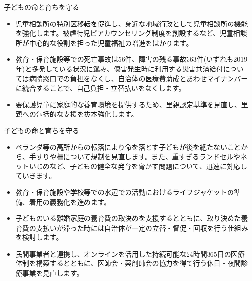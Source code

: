 \documentclass[dvipdfmx]{beamer}
\begin{document}
    \begin{frame}{子どもの命と育ちを守る}{}
        \begin{small}
            \begin{itemize}
                \setlength{\itemsep}{2mm}
                \item 児童相談所の特別区移転を促進し、身近な地域行政として児童相談所の機能を強化します。被虐待児ピアカウンセリング制度を創設するなど、児童相談所が中心的な役割を担った児童福祉の増進をはかります。
                \item 教育・保育施設等での死亡事故は56件、障害の残る事故363件(いずれも2019年)と多発している状況に鑑み、傷害発生時に利用する災害共済給付については病院窓口での負担をなくし、自治体の医療費助成とあわせマイナンバーに統合することで、自己負担・立替払いをなくします。
                \item 要保護児童に家庭的な養育環境を提供するため、里親認定基準を見直し、里親への包括的な支援を抜本強化します。
            \end{itemize}
        \end{small}
    \end{frame}

    \begin{frame}{子どもの命と育ちを守る}{}
        \begin{small}
            \begin{itemize}
                \setlength{\itemsep}{2mm}
                \item ベランダ等の高所からの転落により命を落とす子どもが後を絶たないことから、手すりや柵について規制を見直します。また、重すぎるランドセルやネットいじめなど、子どもの健全な発育を脅かす問題について、迅速に対応していきます。
                \item 教育・保育施設や学校等での水辺での活動におけるライフジャケットの準備、着用の義務化を進めます。
                \item 子どものいる離婚家庭の養育費の取決めを支援するとともに、取り決めた養育費の支払いが滞った時には自治体が一定の立替・督促・回収を行う仕組みを検討します。
                \item 民間事業者と連携し、オンラインを活用した持続可能な24時間365日の医療体制を構築するとともに、医師会・薬剤師会の協力を得て行う休日・夜間診療事業を見直します。
            \end{itemize}
        \end{small}
    \end{frame}
\end{document}
